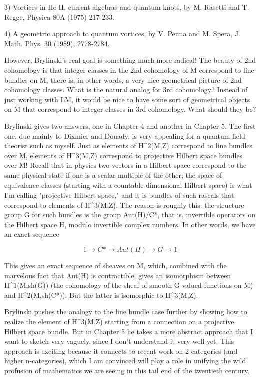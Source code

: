 3) Vortices in He II, current algebras and quantum knots, by M. Rasetti
and T. Regge, Physica 80A (1975) 217-233.

4) A geometric approach to quantum vortices, by V. Penna and M. Spera,
J. Math. Phys. 30 (1989), 2778-2784.  

However, Brylinski's real goal is something much more radical!  The
beauty of 2nd cohomology is that integer classes in the 2nd cohomology
of M correspond to line bundles on M; there is, in other words, a very
nice geometrical picture of 2nd cohomology classes.  What is the natural
analog for 3rd cohomology?  Instead of just working with LM, it would be
nice to have some sort of geometrical objects on M that correspond to
integer classes in 3rd cohomology.  What should they be?

Brylinski gives two answers, one in Chapter 4 and another in Chapter 5.
The first one, due mainly to Dixmier and Douady, is very appealing for
a quantum field theorist such as myself.  Just as elements of H^2(M,Z)
correspond to line bundles over M, elements of H^3(M,Z) correspond to
projective Hilbert space bundles over M!   Recall that in physics two
vectors in a Hilbert space correspond to the same physical state if one
is a scalar multiple of the other; the space of equivalence classes
(starting with a countable-dimensional Hilbert space) is what I'm
calling "projective Hilbert space," and it is bundles of such rascals
that correspond to elements of H^3(M,Z).  The reason is roughly this:
the structure group G for such bundles is the group Aut(H)/C*, that is,
invertible operators on the Hilbert space H, modulo invertible complex
numbers.  In other words, we have an exact sequence

$$
             1 \to  C* \to  Aut(H) \to  G \to  1
$$
    

This gives an exact sequence of sheaves on M, which, combined with the
marvelous fact that Aut(H) is contractible, gives an isomorphism between
H^1(M,sh(G)) (the cohomology of the sheaf of smooth G-valued functions
on M) and H^2(M,sh(C*)).  But the latter is isomorphic to H^3(M,Z).  

Brylinski pushes the analogy to the line bundle case further by showing
how to realize the element of H^3(M,Z) starting from a connection on a
projective Hilbert space bundle.  But in Chapter 5 he takes a more
abstract approach that I want to sketch very vaguely, since I don't
understand it very well yet.  This approach is exciting because it
connects to recent work on 2-categories (and higher n-categories), which
I am convinced will play a role in unifying the wild profusion of
mathematics we are seeing in this tail end of the twentieth century.  

